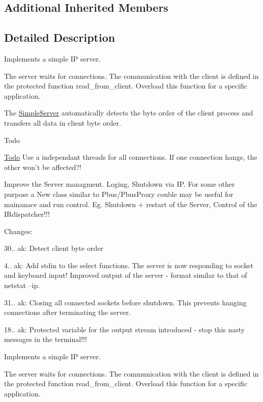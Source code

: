 \subsection*{Additional Inherited Members}


\subsection{Detailed Description}
Implements a simple I\-P server.

The server waits for connections. The communication with the client is defined in the protected function read\-\_\-from\-\_\-client. Overload this function for a specific application.

The \hyperlink{classSimpleServer}{Simple\-Server} automatically detects the byte order of the client process and transfers all data in client byte order.

\begin{DoxyRefDesc}{Todo}
\item[\hyperlink{todo__todo000006}{Todo}]Use a independant threads for all connections. If one connection hangs, the other won't be affected?! 

Improve the Server managment. Loging, Shutdown via I\-P. For some other purpose a New class similar to Pbus/\-Pbus\-Proxy couble may be useful for mainanace and run control. Eg. Shutdown + restart of the Server, Control of the I\-Rdispatcher!!!\end{DoxyRefDesc}


Changes\-: \begin{DoxyItemize}
\item 30.. ak\-: Detect client byte order \item 4.. ak\-: Add stdin to the select functions. The server is now responding to socket and keyboard input! Improved output of the server -\/ format similar to that of netstat --ip. \item 31.. ak\-: Closing all connected sockets before shutdown. This prevents hanging connections after terminating the server. \item 18.. ak\-: Protected variable for the output stream introduced -\/ stop this nasty messages in the terminal!!!\end{DoxyItemize}
Implements a simple I\-P server.

The server waits for connections. The communication with the client is defined in the protected function read\-\_\-from\-\_\-client. Overload this function for a specific application.

